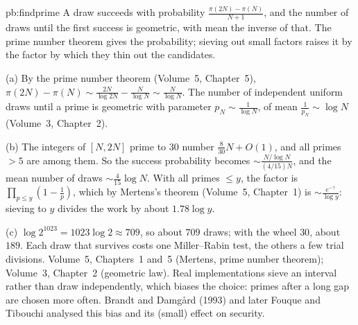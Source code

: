 \begin{solution}{pb:findprime}
\idea A draw succeeds with probability $\frac{\pi(2N)-\pi(N)}{N+1}$, and the number of draws until the first success is geometric, with
mean the inverse of that. The prime number theorem gives the probability; sieving out small factors raises it by the factor by
which they thin out the candidates.

\writeup (a) By the prime number theorem (Volume~5, Chapter~5), $\pi(2N)-\pi(N)\sim\frac{2N}{\log2N}-\frac N{\log N}\sim\frac N{\log N}$. The
number of independent uniform draws until a prime is geometric with parameter $p_N\sim\frac1{\log N}$, of mean $\frac1{p_N}\sim\log N$
(Volume~3, Chapter~2).

(b) The integers of $[N,2N]$ prime to $30$ number $\frac8{30}N+O(1)$, and all primes $>5$ are among them. So the success probability
becomes $\sim\frac{N/\log N}{(4/15)N}$, and the mean number of draws $\sim\frac4{15}\log N$. With all primes $\le y$, the factor is
$\prod_{p\le y}(1-\frac1p)$, which by Mertens's theorem (Volume~5, Chapter~1) is $\sim\frac{e^{-\gamma}}{\log y}$: sieving to $y$ divides the
work by about $1.78\log y$.

(c) $\log2^{1023}=1023\log2\approx709$, so about $709$ draws; with the wheel $30$, about $189$. Each draw that survives costs one
Miller--Rabin test, the others a few trial divisions.
\tools Volume~5, Chapters~1 and~5 (Mertens, prime number theorem); Volume~3, Chapter~2 (geometric law).
\leads Real implementations sieve an interval rather than draw independently, which biases the choice: primes after a long gap are
chosen more often. Brandt and Damgård (1993) and later Fouque and Tibouchi analysed this bias and its (small) effect on security.
\end{solution}

